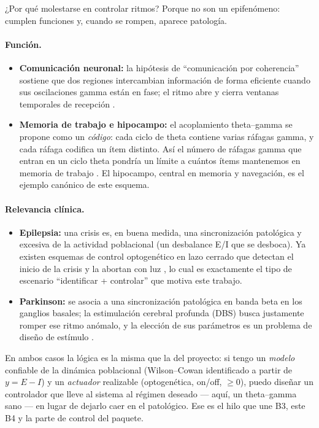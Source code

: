 \documentclass[11pt,a4paper]{article}
\begin{document}
¿Por qué molestarse en controlar ritmos? Porque no son un epifenómeno: cumplen
funciones y, cuando se rompen, aparece patología.

\paragraph{Función.}
\begin{itemize}[nosep]
  \item \textbf{Comunicación neuronal:} la hipótesis de ``comunicación por coherencia''
        sostiene que dos regiones intercambian información de forma eficiente cuando sus
        oscilaciones gamma están en fase; el ritmo abre y cierra ventanas temporales de
        recepción \cite{buzsaki2006rhythms}.
  \item \textbf{Memoria de trabajo e hipocampo:} el acoplamiento theta--gamma se
        propone como un \emph{código}: cada ciclo de theta contiene varias ráfagas
        gamma, y cada ráfaga codifica un ítem distinto. Así el número de ráfagas gamma
        que entran en un ciclo theta pondría un límite a cuántos ítems mantenemos en
        memoria de trabajo \cite{lisman2013thetagamma}. El hipocampo, central en
        memoria y navegación, es el ejemplo canónico de este esquema.
\end{itemize}

\paragraph{Relevancia clínica.}
\begin{itemize}[nosep]
  \item \textbf{Epilepsia:} una crisis es, en buena medida, una sincronización
        patológica y excesiva de la actividad poblacional (un desbalance E/I que se
        desboca). Ya existen esquemas de control optogenético en lazo cerrado que
        detectan el inicio de la crisis y la abortan con luz
        \cite{krookmagnuson2013seizures}, lo cual es exactamente el tipo de escenario
        ``identificar + controlar'' que motiva este trabajo.
  \item \textbf{Parkinson:} se asocia a una sincronización patológica en banda beta en
        los ganglios basales; la estimulación cerebral profunda (DBS) busca justamente
        romper ese ritmo anómalo, y la elección de sus parámetros es un problema de
        diseño de estímulo \cite{kuncel2004dbs}.
\end{itemize}

En ambos casos la lógica es la misma que la del proyecto: si tengo un \emph{modelo}
confiable de la dinámica poblacional (Wilson--Cowan identificado a partir de $y=E-I$) y
un \emph{actuador} realizable (optogenética, on/off, $\geq 0$), puedo diseñar un
controlador que lleve al sistema al régimen deseado --- aquí, un theta--gamma sano ---
en lugar de dejarlo caer en el patológico. Ese es el hilo que une B3, este B4 y la
parte de control del paquete.
\end{document}
